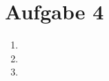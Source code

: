 \documentclass[11pt,a4paper,ngerman]{article}
\begin{document}
\section*{Aufgabe 4}
\begin{enumerate}[\bfseries a)]
\item

\item


\item

\end{enumerate}

\label{LastPage}
\end{document}
